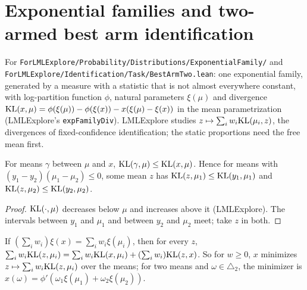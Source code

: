 \section{Exponential families and two-armed best arm identification}

For \texttt{ForLMLExplore/Probability/Distributions/ExponentialFamily/} and
\texttt{ForLMLExplore/Identification/Task/BestArmTwo.lean}: one exponential family, generated by a
measure with a statistic that is not almost everywhere constant, with log-partition function
$\phi$, natural parameters $\xi(\mu)$ and divergence
$\mathrm{KL}(x, \mu) = \phi(\xi(\mu)) - \phi(\xi(x)) - x (\xi(\mu) - \xi(x))$ in the mean parametrization
(LMLExplore's \texttt{expFamilyDiv}). LMLExplore studies $z \mapsto \sum_i w_i \mathrm{KL}(\mu_i, z)$, the
divergences of fixed-confidence identification; the static proportions need the free mean first.

\begin{lemma}
  \label{lem:expFamilyDiv_left_mono}
  \leanok
  For means $\gamma$ between $\mu$ and $x$, $\mathrm{KL}(\gamma, \mu) \le \mathrm{KL}(x, \mu)$. Hence for means
  with $(y_1 - y_2)(\mu_1 - \mu_2) \le 0$, some mean $z$ has $\mathrm{KL}(z, \mu_1) \le \mathrm{KL}(y_1, \mu_1)$ and
  $\mathrm{KL}(z, \mu_2) \le \mathrm{KL}(y_2, \mu_2)$.
\end{lemma}

\begin{proof}
  \leanok
  $\mathrm{KL}(\cdot, \mu)$ decreases below $\mu$ and increases above it (LMLExplore). The intervals
  between $y_1$ and $\mu_1$ and between $y_2$ and $\mu_2$ meet; take $z$ in both.
\end{proof}

\begin{lemma}
  \label{lem:compensation_left}
  \leanok
  If $(\sum_i w_i) \xi(x) = \sum_i w_i \xi(\mu_i)$, then for every $z$,
  $\sum_i w_i \mathrm{KL}(z, \mu_i) = \sum_i w_i \mathrm{KL}(x, \mu_i) + (\sum_i w_i) \mathrm{KL}(z, x)$. So for $w \ge 0$,
  $x$ minimizes $z \mapsto \sum_i w_i \mathrm{KL}(z, \mu_i)$ over the means; for two means and
  $\omega \in \triangle_2$, the minimizer is $x(\omega) = \phi'(\omega_1 \xi(\mu_1) + \omega_2
  \xi(\mu_2))$.
\end{lemma}


